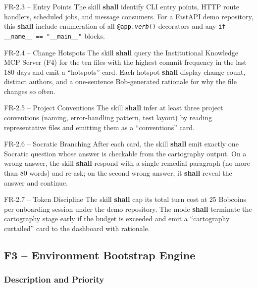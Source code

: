 \documentclass[11pt,letterpaper]{article}
\newcommand{\shall}{\textbf{shall}}
\begin{document}
\begin{reqbox}{FR-2.3 -- Entry Points}
The skill \shall{} identify CLI entry points, HTTP route handlers, scheduled jobs, and message consumers. For a FastAPI demo repository, this \shall{} include enumeration of all \texttt{@app.\textit{verb}()} decorators and any \texttt{if \_\_name\_\_ == "\_\_main\_\_"} blocks.
\end{reqbox}

\begin{reqbox}{FR-2.4 -- Change Hotspots}
The skill \shall{} query the Institutional Knowledge MCP Server (F4) for the ten files with the highest commit frequency in the last 180 days and emit a ``hotspots'' card. Each hotspot \shall{} display change count, distinct authors, and a one-sentence Bob-generated rationale for why the file changes so often.
\end{reqbox}

\begin{reqbox}{FR-2.5 -- Project Conventions}
The skill \shall{} infer at least three project conventions (naming, error-handling pattern, test layout) by reading representative files and emitting them as a ``conventions'' card.
\end{reqbox}

\begin{reqbox}{FR-2.6 -- Socratic Branching}
After each card, the skill \shall{} emit exactly one Socratic question whose answer is checkable from the cartography output. On a wrong answer, the skill \shall{} respond with a single remedial paragraph (no more than 80 words) and re-ask; on the second wrong answer, it \shall{} reveal the answer and continue.
\end{reqbox}

\begin{reqbox}{FR-2.7 -- Token Discipline}
The skill \shall{} cap its total turn cost at 25 Bobcoins per onboarding session under the demo repository. The mode \shall{} terminate the cartography stage early if the budget is exceeded and emit a ``cartography curtailed'' card to the dashboard with rationale.
\end{reqbox}

\subsection{F3 -- Environment Bootstrap Engine}

\subsubsection{Description and Priority}
\end{document}
